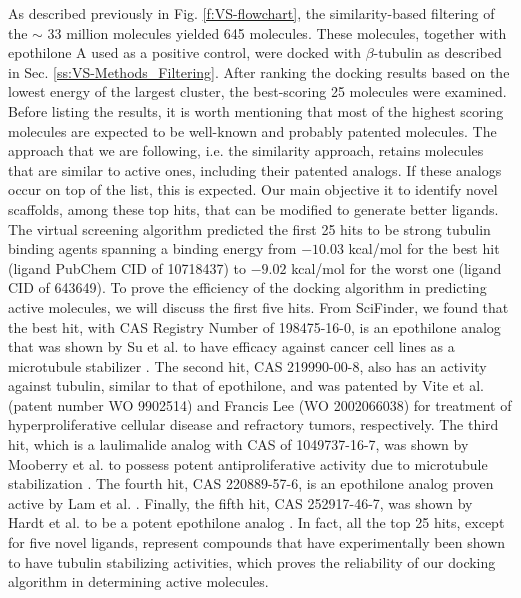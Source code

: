 \documentclass[11pt]{report}
\begin{document}
As described previously in Fig.
\ref{f:VS-flowchart}, 
the similarity-based filtering of the $\sim$ 33 million molecules yielded 645 molecules. These molecules, together with epothilone A used as a positive control,
were docked with $\beta$-tubulin as described in Sec.
\ref{ss:VS-Methods_Filtering}. 
After ranking the docking results based on the lowest energy of the largest cluster, the best-scoring 25 molecules were examined. Before listing the results, it is worth mentioning that most of the highest scoring molecules are expected to be well-known and probably patented molecules. The approach that we are following, i.e. the similarity approach, retains molecules that are similar to active ones, including their patented analogs. If these analogs occur on top of the list, this is expected. Our main objective it to identify novel scaffolds, among these top hits, that can be modified to generate better ligands. The virtual screening algorithm predicted the first 25 hits to be strong tubulin binding agents spanning a binding
energy from $-10.03$ kcal/mol for the best hit (ligand PubChem CID of 10718437) to $-9.02$ kcal/mol for the worst one (ligand CID of 643649). 
To prove the efficiency of the docking algorithm in predicting active molecules, we will discuss the first five hits. From SciFinder, we found that the best hit, with CAS Registry Number of 198475-16-0, is an epothilone analog that was shown by Su et al. to have efficacy against cancer cell lines as a microtubule stabilizer
\cite{Su1997}. 
The second hit, CAS 219990-00-8, also has an activity against tubulin, similar to that of epothilone, and was patented by Vite et al. (patent number WO 9902514) and Francis Lee (WO 2002066038) for treatment of hyperproliferative cellular disease and refractory tumors, respectively. The third hit, which is a laulimalide analog with CAS of 1049737-16-7, was shown by Mooberry et al. to possess potent antiproliferative activity due to microtubule stabilization
\cite{Mooberry2008}. 
The fourth hit, CAS 220889-57-6, is an epothilone analog proven active by Lam et al.
\cite{Lam2012}.
Finally, the fifth hit, CAS 252917-46-7, was shown by Hardt et al. to be a potent epothilone analog
\cite{Hardt2001}.
In fact, all the top 25 hits, except for five novel ligands, represent compounds that have experimentally been shown to have tubulin stabilizing activities, which proves the reliability of our docking algorithm in determining active molecules. 
\end{document}
